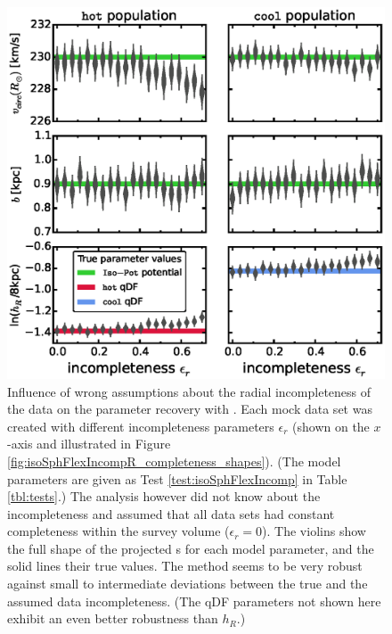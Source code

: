 \begin{figure}[!htbp]
\centering
\includegraphics[width=\columnwidth]{figs/isoSphFlexIncompR_violins_2.eps}
\caption{Influence of wrong assumptions about the radial incompleteness of the data on the parameter recovery with \RM{}. Each mock data set was created with different incompleteness parameters $\epsilon_r$ (shown on the $x$-axis and illustrated in Figure \ref{fig:isoSphFlexIncompR_completeness_shapes}). (The model parameters are given as Test \ref{test:isoSphFlexIncomp} in Table \ref{tbl:tests}.) The analysis however did not know about the incompleteness and assumed that all data sets had constant completeness within the survey volume ($\epsilon_r = 0$). The violins show the full shape of the projected \pdf{}s for each model parameter, and the solid lines their true values. The \RM{} method seems to be very robust against small to intermediate deviations between the true and the assumed data incompleteness. (The qDF parameters not shown here exhibit an even better robustness than $h_R$.) } 
\label{fig:isoSphFlexIncompR_violins}
\end{figure}

